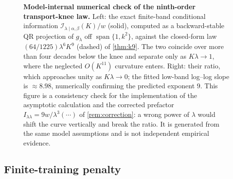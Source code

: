 \documentclass[11pt]{article}
\newcommand{\calI}{\mathcal I}
\begin{document}
\begin{figure}[htbp]
\centering
\centering
{}

\caption{\textbf{Model-internal numerical check of the ninth-order transport-knee law.} Left: the exact finite-band conditional information \(\calI_{\lambda\mid\alpha,\beta}(K)/w\) (solid), computed as a backward-stable QR projection of \(g_\lambda\) off \(\operatorname{span}\{1,k^2\}\), against the closed-form law \((64/1225)\lambda^6K^9\) (dashed) of \cref{thm:k9}. The two coincide over more than four decades below the knee and separate only as \(K\lambda\to1\), where the neglected \(O(K^{11})\) curvature enters. Right: their ratio, which approaches unity as \(K\lambda\to0\); the fitted low-band log--log slope is \(\approx 8.98\), numerically confirming the predicted exponent \(9\). This figure is a consistency check for the implementation of the asymptotic calculation and the corrected prefactor \(I_{\lambda\lambda}=9w/\lambda^3(\cdots)\) of \cref{rem:correction}: a wrong power of \(\lambda\) would shift the curve vertically and break the ratio. It is generated from the same model assumptions and is not independent empirical evidence.}
\label{fig:transport-knee}
\end{figure}

\subsection{Finite-training penalty}
\end{document}
